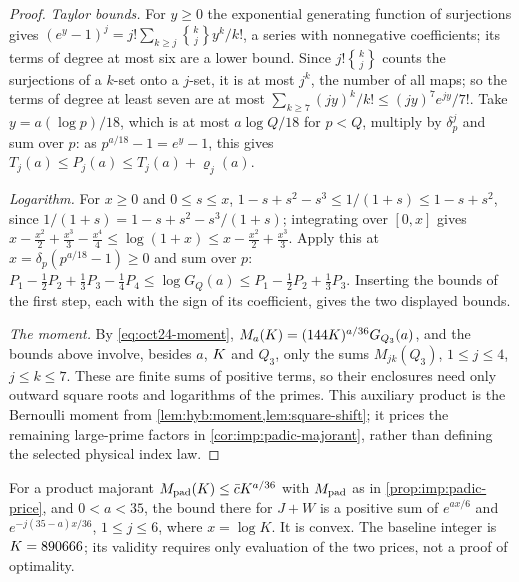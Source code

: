 \begin{proof}
\emph{Taylor bounds.} For $y\ge0$ the exponential generating function of
surjections gives
$(e^y-1)^j=j!\sum_{k\ge j}\genfrac{\{}{\}}{0pt}{1}{k}{j}y^k/k!$, a series with
nonnegative coefficients; its terms of degree at most six are a lower bound.
Since $j!\genfrac{\{}{\}}{0pt}{1}{k}{j}$ counts the surjections of a $k$-set
onto a $j$-set, it is at most $j^k$, the number of all maps; so the terms of
degree at least seven are at most
$\sum_{k\ge7}(jy)^k/k!\le(jy)^7e^{jy}/7!$. Take $y=a(\log p)/18$, which is at
most $a\log Q/18$ for $p<Q$, multiply by $\delta_p^j$ and sum over $p$: as
$p^{a/18}-1=e^y-1$, this gives $T_j(a)\le P_j(a)\le T_j(a)+\varrho_j(a)$.

\emph{Logarithm.} For $x\ge0$ and $0\le s\le x$,
$1-s+s^2-s^3\le1/(1+s)\le1-s+s^2$, since $1/(1+s)=1-s+s^2-s^3/(1+s)$;
integrating over $[0,x]$ gives
$x-\frac{x^2}2+\frac{x^3}3-\frac{x^4}4\le\log(1+x)\le x-\frac{x^2}2+\frac{x^3}3$.
Apply this at $x=\delta_p(p^{a/18}-1)\ge0$ and sum over $p$:
$P_1-\frac12P_2+\frac13P_3-\frac14P_4\le\log G_Q(a)\le P_1-\frac12P_2+\frac13P_3$.
Inserting the bounds of the first step, each with the sign of its
coefficient, gives the two displayed bounds.

\emph{The moment.} By \eqref{eq:oct24-moment}, $M_a(K)=(144K)^{a/36}G_{Q_3}(a)$,
and the bounds above involve, besides $a$, $K$ and $Q_3$, only the sums
$M_{jk}(Q_3)$, $1\le j\le4$, $j\le k\le7$. These are finite sums of positive
terms, so their enclosures need only outward square roots and logarithms of
the primes. This auxiliary product is the Bernoulli moment from
\cref{lem:hyb:moment,lem:square-shift}; it prices the remaining large-prime
factors in \cref{cor:imp:padic-majorant}, rather than defining the
selected physical index law.
\end{proof}

\begin{remark}\label{rem:index-convexity}
For a product majorant $M_{\rm pad}(K)\le\bar c K^{a/36}$ with $M_{\rm pad}$ as in \cref{prop:imp:padic-price}, and $0<a<35$, the bound there for
$J+W$ is a positive sum of $e^{ax/6}$ and
$e^{-j(35-a)x/36}$, $1\le j\le6$, where $x=\log K$.
It is convex. The baseline integer is $K=890666$; its validity
requires only evaluation of the two prices, not a proof of optimality.
\end{remark}

